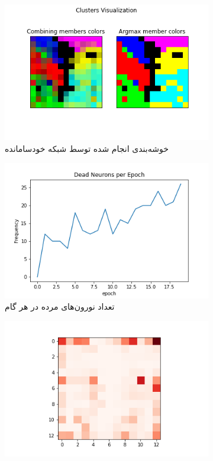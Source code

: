 \documentclass[12pt, a4paper]{article}
\begin{document}
\clearpage

\begin{figure}[h]
    \begin{subfigure}{\linewidth}
        \centering
        \includegraphics[width=0.8\linewidth]{images/q5/r16/cluster.png}
        \caption{خوشه‌بندی انجام شده توسط شبکه خودسامانده}
    \end{subfigure}
    \newline
    \begin{subfigure}{0.45\linewidth}
        \includegraphics[width=\linewidth]{images/q5/r16/dead.png}
        \caption{تعداد نورون‌های مرده در هر گام}
    \end{subfigure}
    \hfill
    \begin{subfigure}{0.45\linewidth}
        \includegraphics[width=\linewidth]{images/q5/r16/umatrix.png}

\end{subfigure}
\end{figure}
\end{document}
